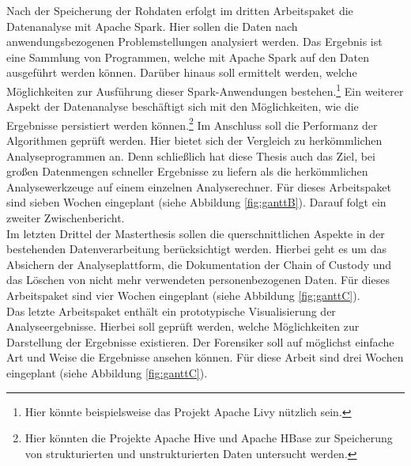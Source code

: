 \noindent
Nach der Speicherung der Rohdaten erfolgt im dritten Arbeitspaket die Datenanalyse mit Apache Spark. Hier sollen die Daten nach anwendungsbezogenen Problemstellungen analysiert werden. Das Ergebnis ist eine Sammlung von Programmen, welche mit Apache Spark auf den Daten ausgeführt werden können. Darüber hinaus soll ermittelt werden, welche Möglichkeiten zur Ausführung dieser Spark-Anwendungen bestehen.\footnote{Hier könnte beispielsweise das Projekt Apache Livy nützlich sein.} Ein weiterer Aspekt der Datenanalyse beschäftigt sich mit den Möglichkeiten, wie die Ergebnisse persistiert werden können.\footnote{Hier könnten die
Projekte Apache Hive und Apache HBase zur Speicherung von strukturierten und unstrukturierten Daten untersucht werden.} Im Anschluss soll die Performanz der Algorithmen geprüft werden. Hier bietet sich der Vergleich zu herkömmlichen Analyseprogrammen an. Denn schließlich hat diese Thesis auch das Ziel, bei großen Datenmengen schneller Ergebnisse zu liefern als die herkömmlichen Analysewerkzeuge auf einem einzelnen Analyserechner. Für dieses Arbeitspaket sind sieben Wochen eingeplant (siehe Abbildung \ref{fig:ganttB}). Darauf folgt ein zweiter Zwischenbericht.\\

\noindent
Im letzten Drittel der Masterthesis sollen die querschnittlichen Aspekte in der bestehenden Datenverarbeitung berücksichtigt werden. Hierbei geht es um das Absichern der Analyseplattform, die Dokumentation der Chain of Custody und das Löschen von nicht mehr verwendeten personenbezogenen Daten. Für dieses Arbeitspaket sind vier Wochen eingeplant (siehe Abbildung \ref{fig:ganttC}).\\

\noindent
Das letzte Arbeitspaket enthält ein prototypische Visualisierung der Analyseergebnisse. Hierbei soll geprüft werden, welche Möglichkeiten zur Darstellung der Ergebnisse existieren. Der Forensiker soll auf möglichst einfache Art und Weise die Ergebnisse ansehen können. Für diese Arbeit sind drei Wochen eingeplant (siehe Abbildung \ref{fig:ganttC}).\\

